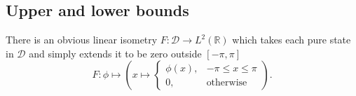 \documentclass[prb,amsmath,amssymb,notitlepage]{revtex4-1}
\newcommand{\var}[2]{\operatorname{\Delta^{\!2}_{{#2}}} #1}
\newcommand{\expe}[2]{\left\langle #1\right\rangle_{#2}}
\newcommand{\ps}[1]{\psi_{#1}}
\newcommand*\diff{\mathop{}\!\mathrm{d}}
\DeclareMathOperator*{\argmin}{argmin}
\DeclareMathOperator{\opp}{P}
\DeclareMathOperator{\opq}{Q}
\begin{document}

%
%
%

\subsection{Upper and lower bounds}
\label{subsec:upper-lower-bounds}
There is an obvious linear isometry $F:\mathcal{D}\to L^2\left(\mathbb{R}\right)$ which takes each pure state in $\mathcal{D}$ and simply extends it to be zero outside $[-\pi,\pi]$
\begin{equation}
	F:\phi\mapsto\left(x\mapsto \begin{cases}\phi(x), &-\pi \leq x \leq \pi\\0,&\text{otherwise}\end{cases}\right).
\end{equation}
\end{document}
